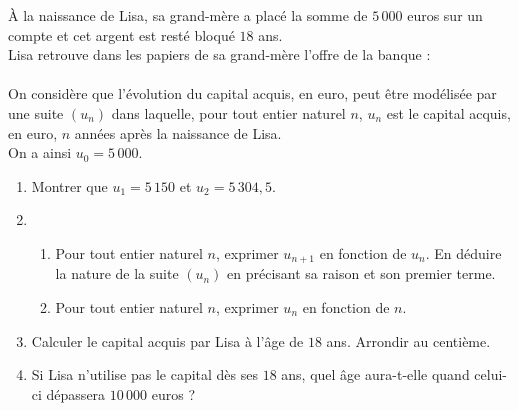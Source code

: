 \documentclass[11pt]{article}
\begin{document}
À la naissance de Lisa, sa grand-mère a placé la somme de $5\,000$ euros sur un
compte et cet argent est resté bloqué $18$ ans.\\
Lisa retrouve dans les papiers de sa grand-mère l'offre de la banque :\\[5mm]
\\[5mm]
On considère que l'évolution du capital acquis, en euro, peut être modélisée par
une suite $(u_n)$ dans laquelle, pour tout entier naturel $n$, $u_n$ est le
capital acquis, en euro, $n$ années après la naissance de Lisa.\\
On a ainsi $u_0=5\,000$.
\begin{enumerate}
  \item Montrer que $u_1=5\,150$ et $u_2=5\,304,5$.
  \item \begin{enumerate}
      \item Pour tout entier naturel $n$, exprimer $u_{n+1}$ en fonction de
        $u_n$. En déduire la nature de la suite $(u_n)$ en précisant sa raison
        et son premier terme.
      \item Pour tout entier naturel $n$, exprimer $u_n$ en fonction de $n$.
    \end{enumerate}
  \item Calculer le capital acquis par Lisa à l'\^age de $18$ ans. Arrondir au
    centième.
  \item Si Lisa n'utilise pas le capital dès ses $18$ ans, quel \^age
    aura-t-elle quand celui-ci dépassera $10\,000$ euros ?
\end{enumerate}
\end{document}

